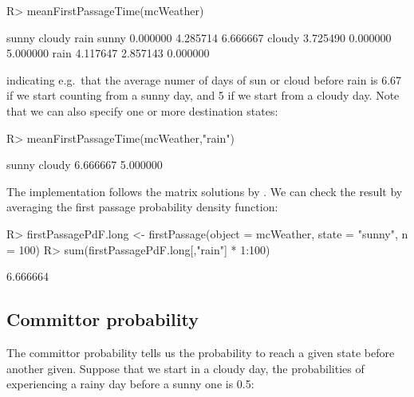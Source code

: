 \documentclass[
  nojss]{jss}
\begin{document}
\begin{CodeChunk}

\begin{CodeInput}
R> meanFirstPassageTime(mcWeather)
\end{CodeInput}

\begin{CodeOutput}
          sunny   cloudy     rain
sunny  0.000000 4.285714 6.666667
cloudy 3.725490 0.000000 5.000000
rain   4.117647 2.857143 0.000000
\end{CodeOutput}
\end{CodeChunk}

indicating e.g.~that the average numer of days of sun or cloud before rain is 6.67 if we start
counting from a sunny day, and 5 if we start from a cloudy day. Note that
we can also specify one or more destination states:

\begin{CodeChunk}

\begin{CodeInput}
R> meanFirstPassageTime(mcWeather,"rain")
\end{CodeInput}

\begin{CodeOutput}
   sunny   cloudy 
6.666667 5.000000 
\end{CodeOutput}
\end{CodeChunk}

The implementation follows the matrix solutions by \citep{GrinsteadSnell}. We can check the result by averaging the first passage probability density function:

\begin{CodeChunk}

\begin{CodeInput}
R> firstPassagePdF.long <- firstPassage(object = mcWeather, state = "sunny",  n = 100)
R> sum(firstPassagePdF.long[,"rain"] * 1:100)
\end{CodeInput}

\begin{CodeOutput}
[1] 6.666664
\end{CodeOutput}
\end{CodeChunk}

\hypertarget{committor-probability}{%
\subsection{Committor probability}\label{committor-probability}}

The committor probability tells us the probability to reach a given state before another given.
Suppose that we start in a cloudy day, the probabilities of experiencing a rainy day before
a sunny one is 0.5:
\end{document}
